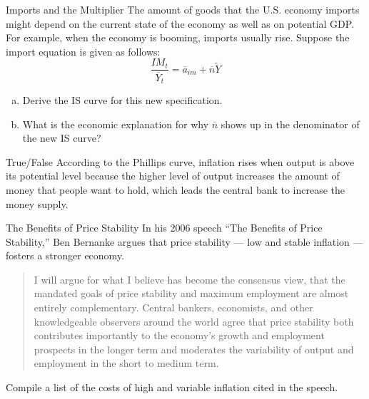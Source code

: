 \documentclass[8pt]{extarticle}
\begin{document}
  \begin{problem}{Imports and the Multiplier}
    The amount of goods that the U.S. economy imports might depend on the current state of the economy as well as on potential GDP. For example, when the economy is booming, imports usually rise. Suppose the import equation is given as follows:
    \[
      \frac{IM_t}{\overline{Y}_t} = \overline{a}_{im} + \overline{n}\tilde{Y}
    \]
    \begin{enumerate}[(a)]
      \item Derive the IS curve for this new specification.
      \item What is the economic explanation for why $\overline{n}$ shows up in the denominator of the new IS curve?
    \end{enumerate}
  \end{problem}
  \begin{problem}{True/False}
    According to the Phillips curve, inflation rises when output is above its potential level because the higher level of output increases the amount of money that people want to hold, which leads the central bank to increase the money supply.
  \end{problem}
  \begin{problem}{The Benefits of Price Stability}
    In his 2006 speech ``The Benefits of Price Stability,'' Ben Bernanke argues that price stability --- low and stable inflation --- fosters a stronger economy.
    \begin{quote}
        I will argue for what I believe has become the consensus view, that the mandated goals of price stability and maximum employment are almost entirely complementary. Central bankers, economists, and other knowledgeable observers around the world agree that price stability both contributes importantly to the economy's growth and employment prospects in the longer term and moderates the variability of output and employment in the short to medium term.
    \end{quote}
    Compile a list of the costs of high and variable inflation cited in the speech.
  \end{problem}
\end{document}
